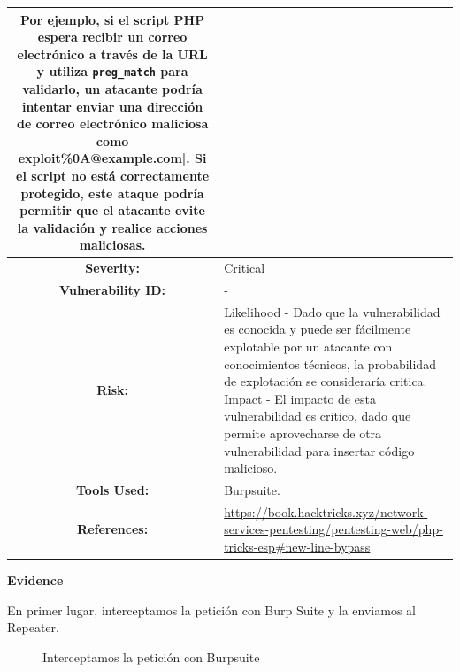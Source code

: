 \documentclass[a4paper]{article} %
\begin{document}
\begin{table}[htbp]
\begin{tabularx}{\textwidth}{|c|X|}
{                Por ejemplo, si el script PHP espera recibir un correo electrónico a través de la URL y utiliza \verb|preg_match| para validarlo, un atacante podría intentar enviar una dirección de correo electrónico maliciosa como exploit\%0A@example.com|. Si el script no está correctamente protegido, este ataque podría permitir que el atacante evite la validación y realice acciones maliciosas.
            } \\
            \hline
            \cellcolor{lightgray}\textbf{Severity:} &
            {
                Critical
            } \\
            \hline
            \cellcolor{lightgray}\textbf{Vulnerability ID:} &
            {-} \\
            \hline
            \cellcolor{lightgray}\textbf{Risk:} &
            {
                Likelihood - Dado que la vulnerabilidad es conocida y puede ser fácilmente explotable por un atacante con conocimientos técnicos, la probabilidad de explotación se consideraría critica.
                \newline
                Impact - El impacto de esta vulnerabilidad es critico, dado que permite aprovecharse de otra vulnerabilidad para insertar código malicioso.
            } \\
            \hline
            \cellcolor{lightgray}\textbf{Tools Used:} &
            {
                Burpsuite.
            } \\
            \hline
            \cellcolor{lightgray}\textbf{References:} &        
            {
                \href{https://book.hacktricks.xyz/network-services-pentesting/pentesting-web/php-tricks-esp\#new-line-bypass}{https://book.hacktricks.xyz/network-services-pentesting/pentesting-web/php-tricks-esp\#new-line-bypass}
            } \\
            \hline
        \end{tabularx}
    \end{table}
    
    \clearpage

    \textbf{Evidence}

    En primer lugar, interceptamos la petición con Burp Suite y la enviamos al Repeater.

    \begin{figure}[h]
	\centering
	\setlength{\fboxrule}{0.5pt}
	\caption{Interceptamos la petición con Burpsuite}
    \end{figure}
\end{document}
